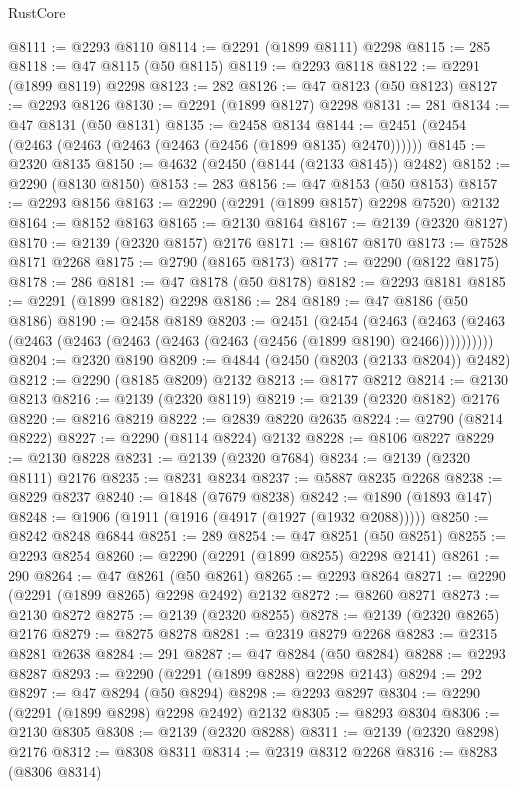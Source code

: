\begin{lexlean}{RustCore}
\begin{coremodule}
@8111 := @2293 @8110
@8114 := @2291 (@1899 @8111) @2298
@8115 := 285
@8118 := @47 @8115 (@50 @8115)
@8119 := @2293 @8118
@8122 := @2291 (@1899 @8119) @2298
@8123 := 282
@8126 := @47 @8123 (@50 @8123)
@8127 := @2293 @8126
@8130 := @2291 (@1899 @8127) @2298
@8131 := 281
@8134 := @47 @8131 (@50 @8131)
@8135 := @2458 @8134
@8144 := @2451 (@2454 (@2463 (@2463 (@2463 (@2463 (@2456 (@1899 @8135) @2470))))))
@8145 := @2320 @8135
@8150 := @4632 (@2450 (@8144 (@2133 @8145)) @2482)
@8152 := @2290 (@8130 @8150)
@8153 := 283
@8156 := @47 @8153 (@50 @8153)
@8157 := @2293 @8156
@8163 := @2290 (@2291 (@1899 @8157) @2298 @7520) @2132
@8164 := @8152 @8163
@8165 := @2130 @8164
@8167 := @2139 (@2320 @8127)
@8170 := @2139 (@2320 @8157) @2176
@8171 := @8167 @8170
@8173 := @7528 @8171 @2268
@8175 := @2790 (@8165 @8173)
@8177 := @2290 (@8122 @8175)
@8178 := 286
@8181 := @47 @8178 (@50 @8178)
@8182 := @2293 @8181
@8185 := @2291 (@1899 @8182) @2298
@8186 := 284
@8189 := @47 @8186 (@50 @8186)
@8190 := @2458 @8189
@8203 := @2451
    (@2454
      (@2463 (@2463 (@2463 (@2463 (@2463 (@2463 (@2463 (@2463 (@2456 (@1899 @8190) @2466))))))))))
@8204 := @2320 @8190
@8209 := @4844 (@2450 (@8203 (@2133 @8204)) @2482)
@8212 := @2290 (@8185 @8209) @2132
@8213 := @8177 @8212
@8214 := @2130 @8213
@8216 := @2139 (@2320 @8119)
@8219 := @2139 (@2320 @8182) @2176
@8220 := @8216 @8219
@8222 := @2839 @8220 @2635
@8224 := @2790 (@8214 @8222)
@8227 := @2290 (@8114 @8224) @2132
@8228 := @8106 @8227
@8229 := @2130 @8228
@8231 := @2139 (@2320 @7684)
@8234 := @2139 (@2320 @8111) @2176
@8235 := @8231 @8234
@8237 := @5887 @8235 @2268
@8238 := @8229 @8237
@8240 := @1848 (@7679 @8238)
@8242 := @1890 (@1893 @147)
@8248 := @1906 (@1911 (@1916 (@4917 (@1927 (@1932 @2088)))))
@8250 := @8242 @8248 @6844
@8251 := 289
@8254 := @47 @8251 (@50 @8251)
@8255 := @2293 @8254
@8260 := @2290 (@2291 (@1899 @8255) @2298 @2141)
@8261 := 290
@8264 := @47 @8261 (@50 @8261)
@8265 := @2293 @8264
@8271 := @2290 (@2291 (@1899 @8265) @2298 @2492) @2132
@8272 := @8260 @8271
@8273 := @2130 @8272
@8275 := @2139 (@2320 @8255)
@8278 := @2139 (@2320 @8265) @2176
@8279 := @8275 @8278
@8281 := @2319 @8279 @2268
@8283 := @2315 @8281 @2638
@8284 := 291
@8287 := @47 @8284 (@50 @8284)
@8288 := @2293 @8287
@8293 := @2290 (@2291 (@1899 @8288) @2298 @2143)
@8294 := 292
@8297 := @47 @8294 (@50 @8294)
@8298 := @2293 @8297
@8304 := @2290 (@2291 (@1899 @8298) @2298 @2492) @2132
@8305 := @8293 @8304
@8306 := @2130 @8305
@8308 := @2139 (@2320 @8288)
@8311 := @2139 (@2320 @8298) @2176
@8312 := @8308 @8311
@8314 := @2319 @8312 @2268
@8316 := @8283 (@8306 @8314)

\end{coremodule}
\end{lexlean}
